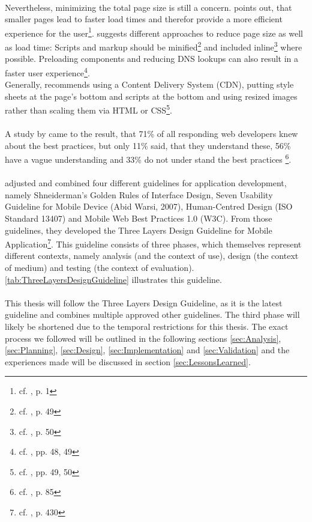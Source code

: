 \\
Nevertheless, minimizing the total page size is still a concern. \cite{Wessels.2011} points out, that smaller pages lead to faster load times and therefor provide a more efficient experience for the user\footnote{cf. \cite{Wessels.2011}, p. 1}. \cite{Nicolaou.2013} suggests different approaches to reduce page size as well as load time: Scripts and markup should be minified\footnote{cf. \cite{Nicolaou.2013}, p. 49} and included inline\footnote{cf. \cite{Nicolaou.2013}, p. 50} where possible. Preloading components and reducing DNS lookups can also result in a faster user experience\footnote{cf. \cite{Nicolaou.2013}, pp. 48, 49}.
\\
Generally, \cite{Nicolaou.2013} recommends using a Content Delivery System (CDN), putting style sheets at the page's bottom and scripts at the bottom and using resized images rather than scaling them via HTML or CSS\footnote{cf. \cite{Nicolaou.2013}, pp. 49, 50}.
\\
\\
A study by \cite{Dahanayake.2010} came to the result, that 71\% of all responding web developers knew about the best practices, but only 11\% said, that they understand these, 56\% have a vague understanding and 33\% do not under stand the best practices \footnote{cf. \cite{Dahanayake.2010}, p. 85}.
\\
\\
\cite{AyobNurulZakiahbinti.2009} adjusted and combined four different guidelines for application development, namely Shneiderman’s Golden Rules of Interface Design, Seven Usability Guideline for Mobile Device (Abid Warsi, 2007), Human-Centred Design (ISO Standard 13407) and Mobile Web Best Practices 1.0 (W3C). From those guidelines, they developed the Three Layers Design Guideline for Mobile Application\footnote{cf. \cite{AyobNurulZakiahbinti.2009}, p. 430}. This guideline consists of three phases, which themselves represent different contexts, namely analysis (and the context of use), design (the context of medium) and testing (the context of evaluation). \ref{tab:ThreeLayersDesignGuideline} illustrates this guideline.
\\
\\
This thesis will follow the Three Layers Design Guideline, as it is the latest guideline and combines multiple approved other guidelines. The third phase will likely be shortened due to the temporal restrictions for this thesis. The exact process we followed will be outlined in the following sections \ref{sec:Analysis}, \ref{sec:Planning}, \ref{sec:Design}, \ref{sec:Implementation} and \ref{sec:Validation} and the experiences made will be discussed in section \ref{sec:LessonsLearned}.

